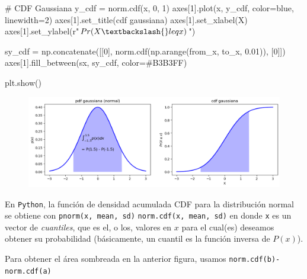\documentclass[
  letterpaper,
  DIV=11,
  numbers=noendperiod]{scrartcl}
\newenvironment{Shaded}{\begin{snugshade}}{\end{snugshade}}
\newcommand{\CommentTok}[1]{\textcolor[rgb]{0.37,0.37,0.37}{#1}}
\newcommand{\DecValTok}[1]{\textcolor[rgb]{0.68,0.00,0.00}{#1}}
\newcommand{\FloatTok}[1]{\textcolor[rgb]{0.68,0.00,0.00}{#1}}
\newcommand{\NormalTok}[1]{\textcolor[rgb]{0.00,0.23,0.31}{#1}}
\newcommand{\OperatorTok}[1]{\textcolor[rgb]{0.37,0.37,0.37}{#1}}
\newcommand{\StringTok}[1]{\textcolor[rgb]{0.13,0.47,0.30}{#1}}
\newcommand{\VerbatimStringTok}[1]{\textcolor[rgb]{0.13,0.47,0.30}{#1}}
\begin{document}
\begin{Shaded}
\begin{Highlighting}[]
\CommentTok{\# CDF Gaussiana}
\NormalTok{y\_cdf }\OperatorTok{=}\NormalTok{ norm.cdf(x, }\DecValTok{0}\NormalTok{, }\DecValTok{1}\NormalTok{)}
\NormalTok{axes[}\DecValTok{1}\NormalTok{].plot(x, y\_cdf, color}\OperatorTok{=}\StringTok{\textquotesingle{}blue\textquotesingle{}}\NormalTok{, linewidth}\OperatorTok{=}\DecValTok{2}\NormalTok{)}
\NormalTok{axes[}\DecValTok{1}\NormalTok{].set\_title(}\StringTok{\textquotesingle{}cdf gaussiana\textquotesingle{}}\NormalTok{)}
\NormalTok{axes[}\DecValTok{1}\NormalTok{].set\_xlabel(}\StringTok{\textquotesingle{}X\textquotesingle{}}\NormalTok{)}
\NormalTok{axes[}\DecValTok{1}\NormalTok{].set\_ylabel(}\VerbatimStringTok{r"$Pr(X \textbackslash{}leq x)$"}\NormalTok{)}

\NormalTok{sy\_cdf }\OperatorTok{=}\NormalTok{ np.concatenate([[}\DecValTok{0}\NormalTok{], norm.cdf(np.arange(from\_x, to\_x, }\FloatTok{0.01}\NormalTok{)), [}\DecValTok{0}\NormalTok{]])}
\NormalTok{axes[}\DecValTok{1}\NormalTok{].fill\_between(sx, sy\_cdf, color}\OperatorTok{=}\StringTok{\textquotesingle{}\#B3B3FF\textquotesingle{}}\NormalTok{)}

\NormalTok{plt.show()}
\end{Highlighting}
\end{Shaded}

\begin{figure}[H]

{\centering \includegraphics{2.1_funciones_distribucion_densidad_files/figure-pdf/cell-12-output-1.png}

}

\end{figure}

En \texttt{Python}, la función de densidad acumulada CDF para la
distribución normal se obtiene con \texttt{pnorm(x,\ mean,\ sd)}
\texttt{norm.cdf(x,\ mean,\ sd)} en donde \texttt{x} es un vector de
\emph{cuantiles}, que es el, o los, valores en \(x\) para el cual(es)
deseamos obtener su probabilidad (básicamente, un cuantil es la función
inversa de \(P(x)\)).

Para obtener el área sombreada en la anterior figura, usamos
\texttt{norm.cdf(b)-norm.cdf(a)}
\end{document}
